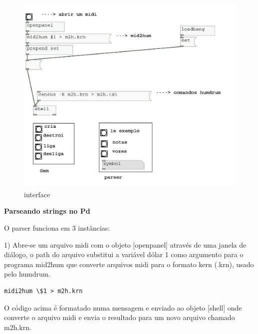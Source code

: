 \documentclass{ppgmus}
\begin{document}
\begin{figure}
\includegraphics[scale=.7]{interface00}
\caption{interface}
\label{interface}
\end{figure} 

\textbf{Parseando strings no Pd}


O parser funciona em 3 instâncias:

1) Abre-se um arquivo midi com o objeto [openpanel] através
de uma janela de diálogo, o path do arquivo substitui a variável 
dólar 1 como argumento para o programa mid2hum que converte
arquivos midi para o formato kern (.krn), usado pelo humdrum.

\singlespacing
\footnotesize
\begin{verbatim}
midi2hum \$1 > m2h.krn
\end{verbatim}
\normalsize
\doublespacing

 

  O código acima é formatado numa mensagem e enviado ao objeto
[shell] onde converte o arquivo midi e envia o resultado para
um novo arquivo chamado m2h.krn.
 
\end{document}
